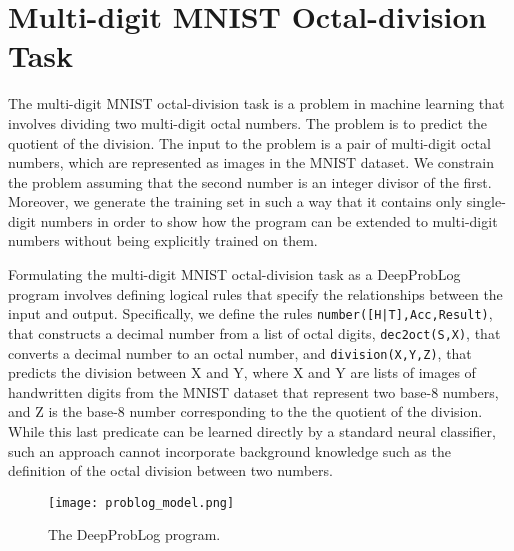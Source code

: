 \section{Multi-digit MNIST Octal-division Task}
\label{sec:task}

The multi-digit MNIST octal-division task is a problem in machine learning that involves dividing two multi-digit octal numbers. The problem is to predict the quotient of the division. The input to the problem is a pair of multi-digit octal numbers, which are represented as images in the MNIST dataset.
We constrain the problem assuming that the second number is an integer divisor of the first. Moreover, we generate the training set in such a way that it contains only single-digit numbers in order to show how the program can be extended to multi-digit numbers without being explicitly trained on them.

Formulating the multi-digit MNIST octal-division task as a DeepProbLog program involves defining logical rules that specify the relationships between the input and output. Specifically, we define the rules \texttt{number([H|T],Acc,Result)}, that constructs a decimal number from a list of octal digits, \texttt{dec2oct(S,X)}, that converts a decimal number to an octal number, and \texttt{division(X,Y,Z)}, that predicts the division between X and Y, where X and Y are lists of images of handwritten digits from the MNIST dataset that represent two base-8 numbers, and Z is the base-8 number corresponding to the the quotient of the division. While this last predicate can be learned directly by a standard neural classifier, such an approach cannot incorporate background knowledge such as the definition of the octal division between two numbers.

\begin{figure}[ht]
\centerline{\texttt{[image: problog\_model.png]}}
\caption{The DeepProbLog program.}
\label{fig:program}
\end{figure}

